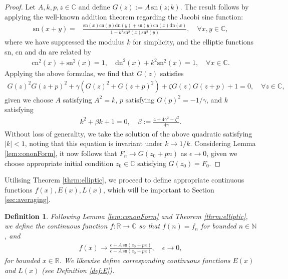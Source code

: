 \documentclass[reqno,a4paper]{amsart}
\numberwithin{equation}{section}
\theoremstyle{plain}
\newtheorem{definition}[theorem]{Definition}
\theoremstyle{remark}
\begin{document}
\begin{proof}
    Let $A,k,p,z\in\mathbb{C}$ and define $G(z):=A\,\text{sn}(z;k)$. The result follows by applying the well-known addition theorem regarding the Jacobi sine function:
    \begin{align*}
        \text{sn}(x+y)=&\frac{\text{sn}(x)\text{cn}(y)\text{dn}(y)+\text{sn}(y)\text{cn}(x)\text{dn}(x)}{1-k^2\text{sn}^2(x)\text{sn}^2(y)},\quad\forall x,y\in\mathbb{C},
    \end{align*}
    where we have suppressed the modulus $k$ for simplicity, and the elliptic functions sn, cn and dn are related by
    \begin{align*}
        \text{cn}^2(x)+\text{sn}^2(x)=1,\quad\text{dn}^2(x)+k^2\text{sn}^2(x)=1,\quad \forall x\in\mathbb{C}.
    \end{align*}
    Applying the above formulas, we find that $G(z)$ satisfies
    \begin{align*}
        G(z)^2G(z+p)^2+\gamma\left(G(z)^2+G(z+p)^2\right)+\zeta G(z)G(z+p)+1=0,\quad\forall z\in\mathbb{C},
    \end{align*}
    given we choose $A$ satisfying $A^2=k$, $p$ satisfying $G(p)^2=-1/\gamma$, and $k$ satisfying
    \begin{align*}
        k^2+\beta k+1=0,\quad \beta:=\frac{4+4\gamma^2-\zeta^2}{4\gamma}.
    \end{align*}
    Without loss of generality, we take the solution of the above quadratic satisfying $|k|<1$, noting that this equation is invariant under $k\to1/k$. Considering Lemma \ref{lem:cononForm}, it now follows that $F_n\to G(z_0+pn)$ as $\epsilon\to0$, given we choose appropriate initial condition $z_0\in\mathbb{C}$ satisfying $G(z_0)=F_0$.
\end{proof}
Utilising Theorem \ref{thrm:elliptic}, we proceed to define appropriate continuous functions $f(x),E(x),L(x)$, which will be important to Section \ref{sec:averaging}.
\begin{definition}\label{def:cont}
    Following Lemma \ref{lem:cononForm} and Theorem \ref{thrm:elliptic}, we define the continuous function $f:\mathbb{R}\rightarrow\mathbb{C}$ so that $f(n)=f_n$ for bounded $n\in\mathbb{N}$, and
    \begin{align*}
        f(x)\to\frac{c+A\,\text{sn}(z_0+px)}{c-A\,\text{sn}(z_0+px)},\quad\epsilon\rightarrow0,
    \end{align*}
    for bounded $x\in\mathbb{R}$. We likewise define corresponding continuous functions $E(x)$ and $L(x)$ (see Definition \ref{def:E}).
\end{definition}
\end{document}
